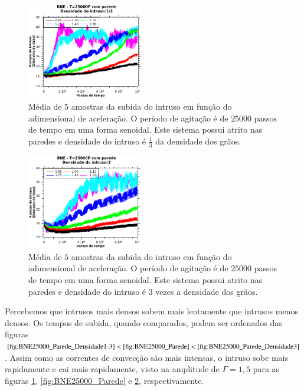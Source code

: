 \begin{figure}
    \centering
    \includegraphics[width=0.45\textwidth]{04-figuras/BNE25000D1-3.png}
    \caption{Média de $5$ amostras da subida do intruso em função do adimensional de aceleração. O período de agitação é de $25000$ passos de tempo em uma forma senoidal. Este sistema possui atrito nas paredes e densidade do intruso é $\frac{1}{3}$ da densidade dos grãos.}
    \label{fig:BNE25000_Parede_Densidade1-3}
\end{figure}

\begin{figure}
    \centering
    \includegraphics[width=0.45\textwidth]{04-figuras/BNE25000D3.png}
    \caption{Média de $5$ amostras da subida do intruso em função do adimensional de aceleração. O período de agitação é de $25000$ passos de tempo em uma forma senoidal. Este sistema possui atrito nas paredes e densidade do intruso é $3$ vezes a densidade dos grãos.}
    \label{fig:BNE25000_Parede_Densidade3}
\end{figure}

    Percebemos que intrusos mais densos sobem mais lentamente que intrusos menos densos. Os tempos de subida, quando comparados, podem ser ordenados das figuras $\ref{fig:BNE25000_Parede_Densidade1-3} < \ref{fig:BNE25000_Parede} < \ref{fig:BNE25000_Parede_Densidade3}$. Assim como as correntes de convecção são mais intensas, o intruso sobe mais rapidamente e cai mais rapidamente, visto na amplitude de $\Gamma = 1,5$ para as figuras \ref{fig:BNE25000_Parede_Densidade1-3}, \ref{fig:BNE25000_Parede} e \ref{fig:BNE25000_Parede_Densidade3}, respectivamente.


